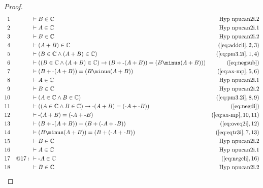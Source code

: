 \begin{proof}
\begin{align}
  1 &&  & \vdash B \in \mathbb{C}&\text{Hyp~npucan2i.2}\notag%
  \\ 2 &&  & \vdash A \in \mathbb{C}&\text{Hyp~npucan2i.1}\notag%
  \\ 3 &&  & \vdash B \in \mathbb{C}&\text{Hyp~npucan2i.2}\notag%
  \\ 4 &&  & \vdash ( A + B ) \in \mathbb{C}&(\mbox{\ref{eq:addcli}},2,3)\notag
  \\ 5 &&  & \vdash ( B \in \mathbb{C} \wedge ( A + B ) \in \mathbb{C} )&(\mbox{\ref{eq:pm3.2i}},1,4)\notag
  \\ 6 &&  & \vdash ( ( B \in \mathbb{C} \wedge ( A + B ) \in \mathbb{C} ) \rightarrow ( B + \textrm{-} ( A + B ) ) = ( B \minus ( A + B ) ) )&(\mbox{\ref{eq:negsub}})\notag
  \\ 7 &&  & \vdash ( B + \textrm{-} ( A + B ) ) = ( B \minus ( A + B ) )&(\mbox{\ref{eq:ax-mp}},5,6)\notag
  \\ 8 &&  & \vdash A \in \mathbb{C}&\text{Hyp~npucan2i.1}\notag%
  \\ 9 &&  & \vdash B \in \mathbb{C}&\text{Hyp~npucan2i.2}\notag%
  \\ 10 &&  & \vdash ( A \in \mathbb{C} \wedge B \in \mathbb{C} )&(\mbox{\ref{eq:pm3.2i}},8,9)\notag
  \\ 11 &&  & \vdash ( ( A \in \mathbb{C} \wedge B \in \mathbb{C} ) \rightarrow \textrm{-} ( A + B ) = ( \textrm{-} A + \textrm{-} B ) )&(\mbox{\ref{eq:negdi}})\notag
  \\ 12 &&  & \vdash \textrm{-} ( A + B ) = ( \textrm{-} A + \textrm{-} B )&(\mbox{\ref{eq:ax-mp}},10,11)\notag
  \\ 13 &&  & \vdash ( B + \textrm{-} ( A + B ) ) = ( B + ( \textrm{-} A + \textrm{-} B ) )&(\mbox{\ref{eq:oveq2i}},12)\notag
  \\ 14 &&  & \vdash ( B \minus ( A + B ) ) = ( B + ( \textrm{-} A + \textrm{-} B ) )&(\mbox{\ref{eq:eqtr3i}},7,13)\notag
  \\ 15 &&  & \vdash B \in \mathbb{C}&\text{Hyp~npucan2i.2}\notag%
  \\ 16 &&  & \vdash A \in \mathbb{C}&\text{Hyp~npucan2i.1}\notag%
  \\ 17 && @17:\  & \vdash \textrm{-} A \in \mathbb{C}&(\mbox{\ref{eq:negcli}},16)\notag
  \\ 18 &&  & \vdash B \in \mathbb{C}&\text{Hyp~npucan2i.2}\notag%

\end{align}
\end{proof}
